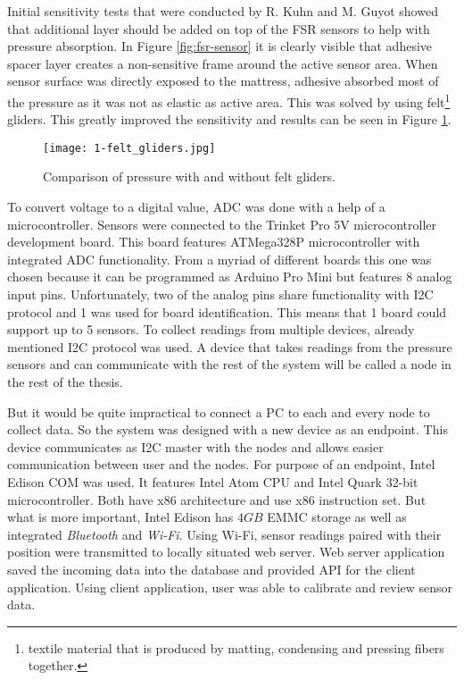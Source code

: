 Initial sensitivity tests that were conducted by R. Kuhn and M. Guyot showed that additional layer should be added on top of the \ac{FSR} sensors to help with pressure absorption. In Figure \ref{fig:fsr-sensor} it is clearly visible that adhesive spacer layer creates a non-sensitive frame around the active sensor area. When sensor surface was directly exposed to the mattress, adhesive absorbed most of the pressure as it was not as elastic as active area. This was solved by using felt\footnote{textile material that is produced by matting, condensing and pressing fibers together.} gliders. This greatly improved the sensitivity and results can be seen in Figure \ref{fig:felt_gliders}.

\begin{figure}[h]
  \begin{center}
    \texttt{[image: 1-felt\_gliders.jpg]}
  \end{center}
  \caption{Comparison of pressure with and without felt gliders.}
  \label{fig:felt_gliders}
\end{figure}

To convert voltage to a digital value, \ac{ADC} was done with a help of a microcontroller. Sensors were connected to the Trinket Pro 5V microcontroller development board\cite{Trinket}. This board features ATMega328P microcontroller with integrated \ac{ADC} functionality\cite{atmega328p}. From a myriad of different boards this one was chosen because it can be programmed as Arduino Pro Mini but features 8 analog input pins. Unfortunately, two of the analog pins share functionality with \ac{I2C} protocol and 1 was used for board identification. This means that 1 board could support up to 5 sensors. To collect readings from multiple devices, already mentioned \ac{I2C} protocol was used. A device that takes readings from the pressure sensors and can communicate with the rest of the system will be called a node in the rest of the thesis.

But it would be quite impractical to connect a \ac{PC} to each and every node to collect data. So the system was designed with a new device as an endpoint. This device communicates as \ac{I2C} master with the nodes and allows easier communication between user and the nodes. For purpose of an endpoint, Intel Edison \ac{COM} was used. It features Intel Atom \ac{CPU} and Intel Quark 32-bit microcontroller\cite{Edison}. Both have x86 architecture and use x86 instruction set. But what is more important, Intel Edison has $4GB$ \ac{EMMC} storage as well as integrated \textit{Bluetooth} and \textit{Wi-Fi}. Using Wi-Fi, sensor readings paired with their position were transmitted to locally situated web server. Web server application saved the incoming data into the database and provided \ac{API} for the client application. Using client application, user was able to calibrate and review sensor data.


